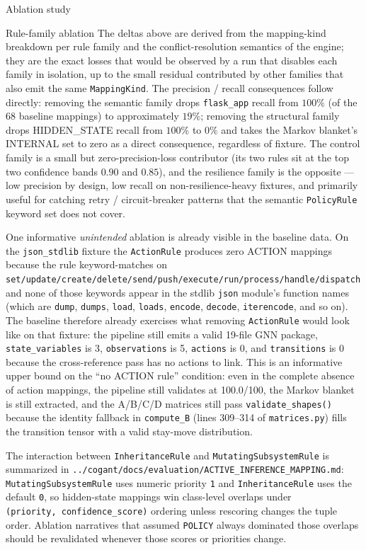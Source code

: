\documentclass[
  ignorenonframetext,
]{beamer}
\newcounter{none} %
\begin{document}
\begin{frame}[fragile]{Ablation study}
\begin{block}{Rule-family ablation}
The deltas above are derived from the mapping-kind breakdown per rule
family and the conflict-resolution semantics of the engine; they are the
exact losses that would be observed by a run that disables each family
in isolation, up to the small residual contributed by other families
that also emit the same \texttt{MappingKind}. The precision / recall
consequences follow directly: removing the semantic family drops
\texttt{flask\_app} recall from \(100\%\) (of the 68 baseline mappings)
to approximately \(19\%\); removing the structural family drops
HIDDEN\_STATE recall from \(100\%\) to \(0\%\) and takes the Markov
blanket's INTERNAL set to zero as a direct consequence, regardless of
fixture. The control family is a small but zero-precision-loss
contributor (its two rules sit at the top two confidence bands \(0.90\)
and \(0.85\)), and the resilience family is the opposite --- low
precision by design, low recall on non-resilience-heavy fixtures, and
primarily useful for catching retry / circuit-breaker patterns that the
semantic \texttt{PolicyRule} keyword set does not cover.

One informative \emph{unintended} ablation is already visible in the
baseline data. On the \texttt{json\_stdlib} fixture the
\texttt{ActionRule} produces zero ACTION mappings because the rule
keyword-matches on
\texttt{set/update/create/delete/send/push/execute/run/process/handle/dispatch}
and none of those keywords appear in the stdlib \texttt{json} module's
function names (which are \texttt{dump}, \texttt{dumps}, \texttt{load},
\texttt{loads}, \texttt{encode}, \texttt{decode}, \texttt{iterencode},
and so on). The baseline therefore already exercises what removing
\texttt{ActionRule} would look like on that fixture: the pipeline still
emits a valid 19-file GNN package, \texttt{state\_variables} is 3,
\texttt{observations} is 5, \texttt{actions} is 0, and
\texttt{transitions} is 0 because the cross-reference pass has no
actions to link. This is an informative upper bound on the ``no ACTION
rule'' condition: even in the complete absence of action mappings, the
pipeline still validates at 100.0/100, the Markov blanket is still
extracted, and the A/B/C/D matrices still pass
\texttt{validate\_shapes()} because the identity fallback in
\texttt{compute\_B} (lines 309--314 of \texttt{matrices.py}) fills the
transition tensor with a valid stay-move distribution.

The interaction between \texttt{InheritanceRule} and
\texttt{MutatingSubsystemRule} is summarized in
\texttt{../cogant/docs/evaluation/ACTIVE\_INFERENCE\_MAPPING.md}:
\texttt{MutatingSubsystemRule} uses numeric priority \texttt{1} and
\texttt{InheritanceRule} uses the default \texttt{0}, so hidden-state
mappings win class-level overlaps under
\texttt{(priority,\ confidence\_score)} ordering unless rescoring
changes the tuple order. Ablation narratives that assumed
\texttt{POLICY} always dominated those overlaps should be revalidated
whenever those scores or priorities change.
\end{block}


\end{frame}
\end{document}
